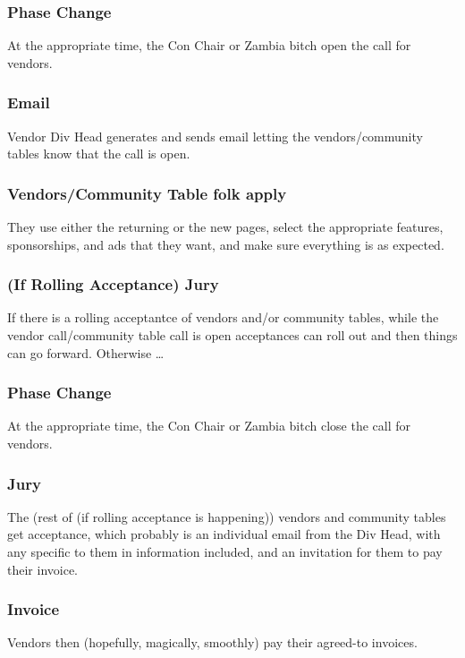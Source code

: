 \documentclass[captions=tablesignature]{scrartcl}
\begin{document}
\subsubsection{Phase Change}
\label{sec-3-2-9}
At the appropriate time, the Con Chair or Zambia bitch open the
call for vendors.

\subsubsection{Email}
\label{sec-3-2-10}
Vendor Div Head generates and sends email letting the
vendors/community tables know that the call is open.

\subsubsection{Vendors/Community Table folk apply}
\label{sec-3-2-11}
They use either the returning or the new pages, select the
appropriate features, sponsorships, and ads that they want, and
make sure everything is as expected.

\subsubsection{(If Rolling Acceptance) Jury}
\label{sec-3-2-12}
If there is a rolling acceptantce of vendors and/or community
tables, while the vendor call/community table call is open
acceptances can roll out and then things can go forward.
Otherwise \ldots{}

\subsubsection{Phase Change}
\label{sec-3-2-13}
At the appropriate time, the Con Chair or Zambia bitch close the
call for vendors.

\subsubsection{Jury}
\label{sec-3-2-14}
The (rest of (if rolling acceptance is happening)) vendors and
community tables get acceptance, which probably is an individual
email from the Div Head, with any specific to them in information
included, and an invitation for them to pay their invoice.

\subsubsection{Invoice}
\label{sec-3-2-15}
Vendors then (hopefully, magically, smoothly) pay their agreed-to
invoices.
\end{document}
